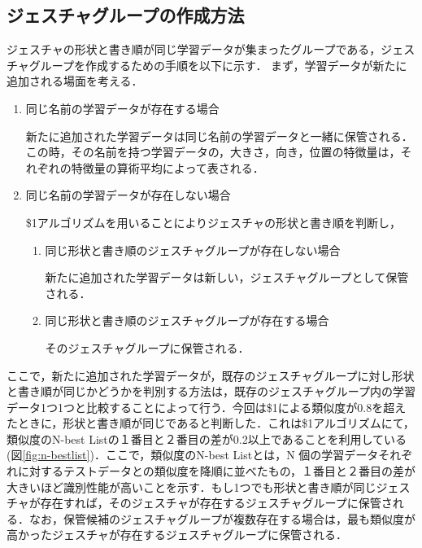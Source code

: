 \subsection{ジェスチャグループの作成方法}
ジェスチャの形状と書き順が同じ学習データが集まったグループである，ジェスチャグループを作成するための手順を以下に示す．
まず，学習データが新たに追加される場面を考える．
\begin{enumerate}
\renewcommand{\labelenumi}{\Alph{enumi}.}
\item 同じ名前の学習データが存在する場合

新たに追加された学習データは同じ名前の学習データと一緒に保管される．この時，その名前を持つ学習データの，大きさ，向き，位置の特徴量は，それぞれの特徴量の算術平均によって表される．
 
\item 同じ名前の学習データが存在しない場合

\$1アルゴリズムを用いることによりジェスチャの形状と書き順を判断し，

\begin{enumerate}
\renewcommand{\labelenumi}{\alph{enumi}.}

\item 同じ形状と書き順のジェスチャグループが存在しない場合
 
新たに追加された学習データは新しい，ジェスチャグループとして保管される．
   
\item 同じ形状と書き順のジェスチャグループが存在する場合

そのジェスチャグループに保管される．

\end{enumerate}
\end{enumerate}

ここで，新たに追加された学習データが，既存のジェスチャグループに対し形状と書き順が同じかどうかを判別する方法は，既存のジェスチャグループ内の学習データ1つ1つと比較することによって行う．今回は\$1による類似度が0.8を超えたときに，形状と書き順が同じであると判断した．これは\$1アルゴリズムにて，類似度のN-best Listの１番目と２番目の差が0.2以上であることを利用している(図\ref{fig:n-bestlist})．ここで，類似度のN-best Listとは，N 個の学習データそれぞれに対するテストデータとの類似度を降順に並べたもの，１番目と２番目の差が大きいほど識別性能が高いことを示す．もし1つでも形状と書き順が同じジェスチャが存在すれば，そのジェスチャが存在するジェスチャグループに保管される．なお，保管候補のジェスチャグループが複数存在する場合は，最も類似度が高かったジェスチャが存在するジェスチャグループに保管される．


